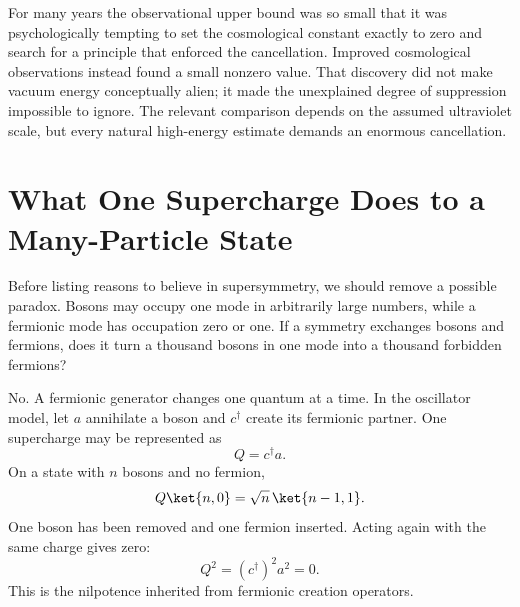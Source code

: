 \begin{classroomqa}
\end{classroomqa}

For many years the observational upper bound was so small that it was psychologically tempting to set the cosmological constant exactly to zero and search for a principle that enforced the cancellation. Improved cosmological observations instead found a small nonzero value. That discovery did not make vacuum energy conceptually alien; it made the unexplained degree of suppression impossible to ignore. The relevant comparison depends on the assumed ultraviolet scale, but every natural high-energy estimate demands an enormous cancellation.

\section{What One Supercharge Does to a Many-Particle State}

Before listing reasons to believe in supersymmetry, we should remove a possible paradox. Bosons may occupy one mode in arbitrarily large numbers, while a fermionic mode has occupation zero or one. If a symmetry exchanges bosons and fermions, does it turn a thousand bosons in one mode into a thousand forbidden fermions?

No. A fermionic generator changes one quantum at a time. In the oscillator model, let \(a\) annihilate a boson and \(c^\dagger\) create its fermionic partner. One supercharge may be represented as
\begin{equation}
Q=c^\dagger a.
\end{equation}
On a state with \(n\) bosons and no fermion,
\begin{equation}
Q\ket{n,0}
=\sqrt n\,\ket{n-1,1}.
\end{equation}
One boson has been removed and one fermion inserted. Acting again with the same charge gives zero:
\begin{equation}
Q^2=(c^\dagger)^2a^2=0.
\end{equation}
This is the nilpotence inherited from fermionic creation operators.


